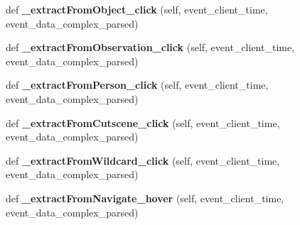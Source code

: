 \begin{DoxyCompactItemize}
\item 
\mbox{\label{classfeature__extractors_1_1_jowilder_extractor_1_1_jowilder_extractor_a95613c3c23ffccf20d2932f137d8129a}} 
def {\bfseries \+\_\+extract\+From\+Object\+\_\+click} (self, event\+\_\+client\+\_\+time, event\+\_\+data\+\_\+complex\+\_\+parsed)
\item 
\mbox{\label{classfeature__extractors_1_1_jowilder_extractor_1_1_jowilder_extractor_a621932c91f317e9ee377224c3f0263f1}} 
def {\bfseries \+\_\+extract\+From\+Observation\+\_\+click} (self, event\+\_\+client\+\_\+time, event\+\_\+data\+\_\+complex\+\_\+parsed)
\item 
\mbox{\label{classfeature__extractors_1_1_jowilder_extractor_1_1_jowilder_extractor_a694edf780256289fb44e1693a1d4c73d}} 
def {\bfseries \+\_\+extract\+From\+Person\+\_\+click} (self, event\+\_\+client\+\_\+time, event\+\_\+data\+\_\+complex\+\_\+parsed)
\item 
\mbox{\label{classfeature__extractors_1_1_jowilder_extractor_1_1_jowilder_extractor_ac6a1c438c1f9559ba8f1a5d3657244b0}} 
def {\bfseries \+\_\+extract\+From\+Cutscene\+\_\+click} (self, event\+\_\+client\+\_\+time, event\+\_\+data\+\_\+complex\+\_\+parsed)
\item 
\mbox{\label{classfeature__extractors_1_1_jowilder_extractor_1_1_jowilder_extractor_a89c9e1424d6a46faa49437a95858b9f8}} 
def {\bfseries \+\_\+extract\+From\+Wildcard\+\_\+click} (self, event\+\_\+client\+\_\+time, event\+\_\+data\+\_\+complex\+\_\+parsed)
\item 
\mbox{\label{classfeature__extractors_1_1_jowilder_extractor_1_1_jowilder_extractor_ad9b7b3cd0d5d24b050bb7a1211d04d57}} 
def {\bfseries \+\_\+extract\+From\+Navigate\+\_\+hover} (self, event\+\_\+client\+\_\+time, event\+\_\+data\+\_\+complex\+\_\+parsed)
\item 
\mbox{\label{classfeature__extractors_1_1_jowilder_extractor_1_1_jowilder_extractor_ac8c70ce17804aff9476f77813fdd9c4e}} 

\end{DoxyCompactItemize}
